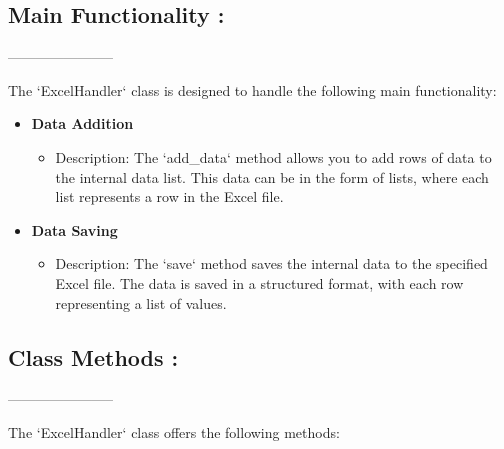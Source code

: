 \documentclass{article}
\begin{document}
\subsection{Main Functionality :}
-----------------------

    The `ExcelHandler` class is designed to handle the following main functionality:

\begin{itemize}
    \item \textbf{Data Addition}
        \begin{itemize}
            \item Description: The `add\_data` method allows you to add rows of data to the internal data list. This data can be in the form of lists, where each list represents a row in the Excel file.
        \end{itemize}
    \item \textbf{Data Saving}
        \begin{itemize}
            \item Description: The `save` method saves the internal data to the specified Excel file. The data is saved in a structured format, with each row representing a list of values.
        \end{itemize}
\end{itemize}
\subsection{Class Methods :}
-----------------------

    The `ExcelHandler` class offers the following methods:
\end{document}
